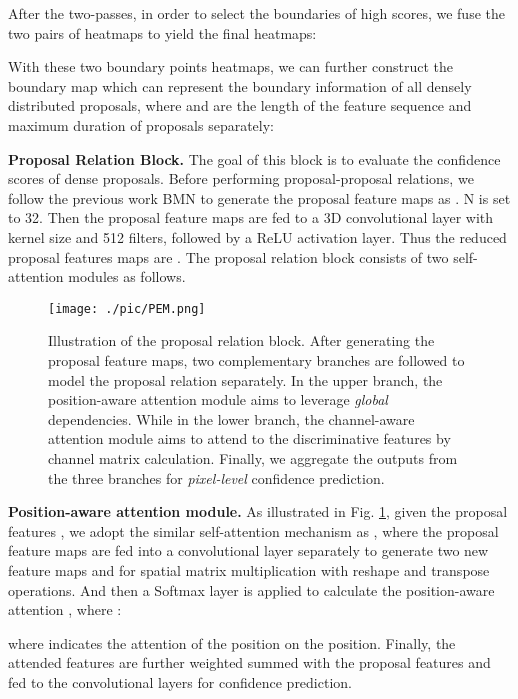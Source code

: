 \documentclass[letterpaper]{article} \usepackage{aaai21}  \usepackage{times}  \usepackage{helvet} \usepackage{courier}  \usepackage[hyphens]{url}  \usepackage{graphicx} \urlstyle{rm} \def\UrlFont{\rm}  \usepackage{natbib}  \usepackage{amsmath,amssymb} \usepackage{caption} \frenchspacing  \usepackage{color}
\begin{document}
After the two-passes, in order to select the boundaries of high scores, we fuse the two pairs of heatmaps to yield the final heatmaps:




With these two boundary points heatmaps, we can further construct the boundary map  which can represent the boundary information of all densely distributed proposals, where  and  are the length of the feature sequence and maximum duration of proposals separately:


 
\noindent
\textbf{Proposal Relation Block.} The goal of this block is to evaluate the confidence scores of dense  proposals. Before performing proposal-proposal relations, we follow the previous work BMN \cite{LinBMN} to generate the proposal feature maps as . N is set to 32. Then the proposal feature maps are fed to a 3D convolutional layer with kernel size  and 512 filters, followed by a ReLU activation layer. Thus the reduced proposal features maps are . The proposal relation block consists of two self-attention modules as follows.

\begin{figure}[t]
\begin{center} 
		\texttt{[image: ./pic/PEM.png]}
	\end{center}
	\caption{Illustration of the proposal relation block. After generating the proposal feature maps, two complementary branches are followed to model the proposal relation separately. In the upper branch, the position-aware attention module aims to leverage \textit{global} dependencies. While in the lower branch, the channel-aware attention module aims to attend to the discriminative features by channel matrix calculation. Finally, we aggregate the outputs from the three branches for \textit{pixel-level} confidence prediction.}
	\label{fig:PEM}
\end{figure}   

\textbf{Position-aware attention module.} As illustrated in Fig. \ref{fig:PEM}, given the proposal features , we adopt the similar self-attention mechanism as \cite{nnn}, where the proposal feature maps are fed into a convolutional layer separately to generate 
two new feature maps  and  for spatial matrix multiplication with reshape and transpose operations. And then a Softmax layer is applied to calculate the position-aware attention , where :

where  indicates the attention of the  position on the  position.  Finally, the attended features are further weighted summed with the proposal features and fed to the convolutional layers for confidence prediction.
\end{document}
